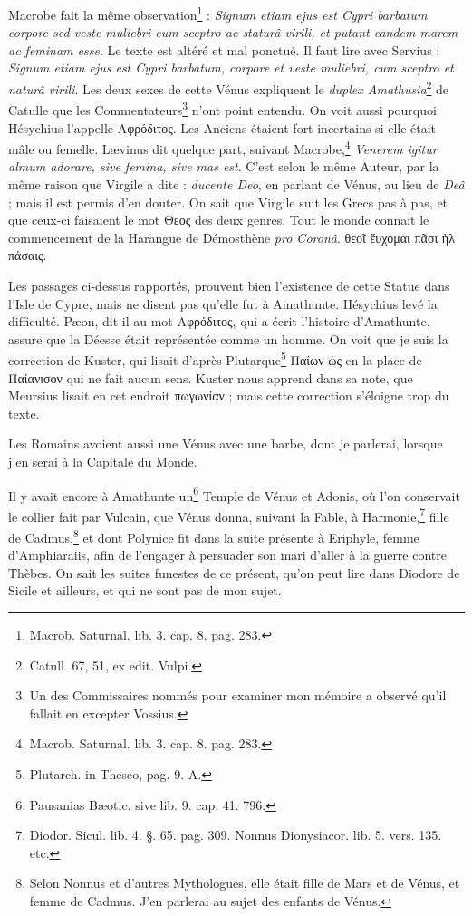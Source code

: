 \documentclass[a4paper, 18pt, oneside]{article}
\begin{document}
Macrobe fait la même observation\footnote{Macrob. Saturnal. lib. 3. cap. 8. pag. 283.} : \emph{Signum etiam ejus est Cypri barbatum corpore sed veste muliebri cum sceptro ac staturâ virili, et putant eandem marem ac feminam esse}. Le texte est altéré et mal ponctué. Il faut lire avec Servius : \emph{Signum etiam ejus est Cypri barbatum, corpore et veste muliebri, cum sceptro et naturâ virili}. Les deux sexes de cette Vénus expliquent le \emph{duplex Amathusia}\footnote{Catull. 67, 51, ex edit. Vulpi.} de Catulle que les Commentateurs\footnote{Un des Commissaires nommés pour examiner mon mémoire a observé qu'il fallait en excepter Vossius.} n'ont point entendu. On voit aussi pourquoi Hésychius l'appelle Αφρόδιτος. Les Anciens étaient fort incertains si elle était mâle ou femelle. Lævinus dit quelque part, suivant Macrobe,\footnote{Macrob. Saturnal. lib. 3. cap. 8. pag. 283.} \emph{Venerem igitur almum adorare, sive femina, sive mas est}. C'est selon le même Auteur, par la même raison que Virgile a dite : \emph{ducente Deo}, en parlant de Vénus, au lieu de \emph{Deâ} ; mais il est permis d'en douter. On sait que Virgile suit les Grecs pas à pas, et que ceux-ci faisaient le mot Θεος des deux genres. Tout le monde connait le commencement de la Harangue de Démosthène \emph{pro Coronâ}. θεοῖ ἔυχομαι πᾶσι ὴλ πάσαις.

Les passages ci-dessus rapportés, prouvent bien l'existence de cette Statue dans l'Isle de Cypre, mais ne disent pas qu'elle fut à Amathunte. Hésychius levé la difficulté. Pæon, dit-il au mot Αφρόδιτος, qui a écrit l'histoire d'Amathunte, assure que la Déesse était représentée comme un homme. On voit que je suis la correction de Kuster, qui lisait d'après Plutarque\footnote{Plutarch. in Theseo, pag. 9. A.} Παίων ὡς en la place de Παίανισον qui ne fait aucun sens. Kuster nous apprend dans sa note, que Meursius lisait en cet endroit πωγωνίαν ; mais cette correction s'éloigne trop du texte.

Les Romains avoient aussi une Vénus avec une barbe, dont je parlerai, lorsque j'en serai à la Capitale du Monde.

Il y avait encore à Amathunte un\footnote{Pausanias Bæotic. sive lib. 9. cap. 41. 796.} Temple de Vénus et Adonis, où l'on conservait le collier fait par Vulcain, que Vénus donna, suivant la Fable, à Harmonie,\footnote{Diodor. Sicul. lib. 4. §. 65. pag. 309. Nonnus Dionysiacor. lib. 5. vers. 135. etc.} fille de Cadmus,\footnote{Selon Nonnus et d'autres Mythologues, elle était fille de Mars et de Vénus, et femme de Cadmus. J'en parlerai au sujet des enfants de Vénus.} et dont Polynice fit dans la suite présente à Eriphyle, femme d'Amphiaraiis, afin de l'engager à persuader son mari d'aller à la guerre contre Thèbes. On sait les suites funestes de ce présent, qu'on peut lire dans Diodore de Sicile et ailleurs, et qui ne sont pas de mon sujet.
\end{document}

